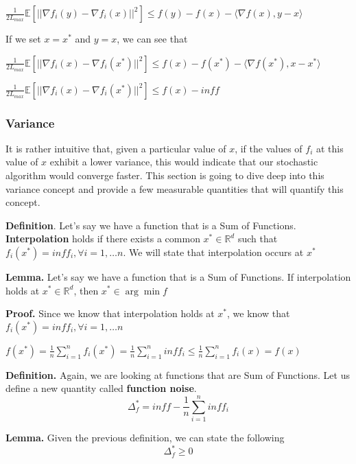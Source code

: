 $\frac{1}{2L_{max}} \mathbb{E}[||\nabla f_i(y) - \nabla f_i(x)||^2] \leq f(y) - f(x) - \langle \nabla f(x), y - x \rangle$

If we set $x = x^*$ and $y = x$, we can see that 

$\frac{1}{2L_{max}} \mathbb{E}[||\nabla f_i(x) - \nabla f_i(x^*)||^2] \leq f(x) - f(x^*) - \langle \nabla f(x^*), x - x^* \rangle$ \newline 

$\frac{1}{2L_{max}} \mathbb{E}[||\nabla f_i(x) - \nabla f_i(x^*)||^2] \leq f(x) - inf f$


\subsubsection{Variance}
It is rather intuitive that, given a particular value of $x$, if the values of $f_i$ at this value of $x$ exhibit a lower variance, this would indicate that our stochastic algorithm would converge faster. This section is going to dive deep into this variance concept and provide a few measurable quantities that will quantify this concept. 

\noindent \textbf{Definition}. Let's say we have a function that is a Sum of Functions. \textbf{Interpolation} holds if there exists a common $x^* \in \mathbb{R}^d$ such that $f_i(x^*) = inf f_i, \forall i = 1, \dots n$. We will state that interpolation occurs at $x^*$

\noindent \textbf{Lemma.} Let's say we have a function that is a Sum of Functions. If interpolation holds at $x^* \in \mathbb{R}^d$, then $x^* \in \arg \min f$

\noindent \textbf{Proof.} 
Since we know that interpolation holds at $x^*$, we know that $f_i(x^*) = inf f_i, \forall i = 1, \dots n$

$f(x^*) = \frac{1}{n} \sum_{i=1}^{n} f_i(x^*) = \frac{1}{n} \sum_{i=1}^{n} inf f_i \leq \frac{1}{n} \sum_{i=1}^{n} f_i(x) = f(x)$

\noindent \textbf{Definition.} Again, we are looking at functions that are Sum of Functions. Let us define a new quantity called \textbf{function noise}. 
\begin{equation}
    \Delta^*_f = inf f - \frac{1}{n} \sum_{i=1}^{n} inf f_i
\end{equation}

\noindent \textbf{Lemma.} Given the previous definition, we can state the following 
\begin{equation}
    \Delta^*_f \geq 0
\end{equation}

